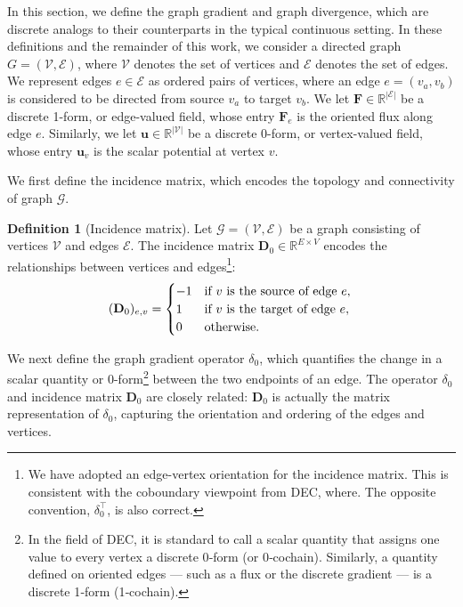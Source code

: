 \documentclass{article}
\theoremstyle{definition}
\newtheorem{definition}{Definition}%
\theoremstyle{remark}
\begin{document}
In this section, we define the graph gradient and graph divergence, which are discrete analogs to their counterparts in the typical continuous setting.  In these definitions and the remainder of this work, we consider a directed graph $G=(\mathcal{V},\mathcal{E})$, where $\mathcal{V}$ denotes the set of vertices and $\mathcal{E}$ denotes the set of edges. We represent edges $e\in\mathcal{E}$ as ordered pairs of vertices, where an edge $e=(v_a,v_b)$ is considered to be directed from source $v_a$ to target $v_b$. We let $\mathbf{F}\in\mathbb{R}^{|\mathcal{E}|}$ be a discrete 1-form, or edge-valued field, whose entry $\mathbf{F}_e$ is the oriented flux along edge $e$. Similarly, we let $\mathbf{u}\in\mathbb{R}^{|\mathcal{V}|}$ be a discrete 0-form, or vertex-valued field, whose entry $\mathbf{u}_v$ is the scalar potential at vertex $v$.

We first define the incidence matrix, which encodes the topology and connectivity of graph $\mathcal{G}$.
\begin{definition}[Incidence matrix]
    Let $\mathcal{G}=(\mathcal{V},\mathcal{E})$ be a graph consisting of vertices $\mathcal{V}$ and edges $\mathcal{E}$. The incidence matrix $\mathbf{D}_0\in\mathbb{R}^{E\times V}$ encodes the relationships between vertices and edges\footnote{We have adopted an edge-vertex orientation for the incidence matrix. This is consistent with the coboundary viewpoint from DEC, where. The opposite convention, $\delta^\intercal_0$, is also correct.}:
    \begin{equation}
    (\mathbf{D}_0)_{e,v} =
    \begin{cases}
        -1 & \text{if $v$ is the source of edge $e$},\\
        1 & \text{if $v$ is the target of edge $e$}, \\
        0 & \text{otherwise}.
    \end{cases}\\
    \end{equation}
\end{definition}
We next define the graph gradient operator $\delta_0$, which quantifies the change in a scalar quantity or 0-form\footnote{In the field of DEC, it is standard to call a scalar quantity that assigns one value to every vertex a discrete 0‑form (or 0‑cochain). Similarly, a quantity defined on oriented edges --- such as a flux or the discrete gradient --- is a discrete 1‑form (1‑cochain).} between the two endpoints of an edge. The operator $\delta_0$ and incidence matrix $\mathbf{D}_0$ are closely related: $\mathbf{D}_0$ is actually the matrix representation of $\delta_0$, capturing the orientation and ordering of the edges and vertices. 
\end{document}
